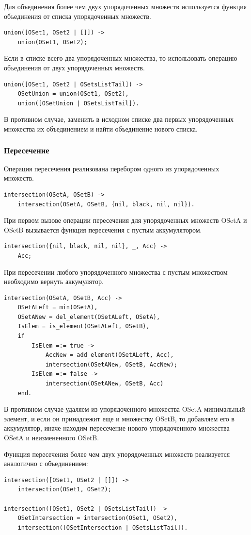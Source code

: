 			Для объединения более чем двух упорядоченных множеств используется функция объединения от списка
			упорядоченных множеств.
			\begin{lstlisting}
union([OSet1, OSet2 | []]) ->
    union(OSet1, OSet2);
			\end{lstlisting}
			Если в списке всего два упорядоченных множества, то использовать операцию объединения от двух 
			упорядоченных множеств.
			\begin{lstlisting}
union([OSet1, OSet2 | OSetsListTail]) ->
    OSetUnion = union(OSet1, OSet2),
    union([OSetUnion | OSetsListTail]).
			\end{lstlisting}
			В противном случае, заменить в исходном списке два первых упорядоченных множества
			их объединением и найти объединение нового списка.
				
		\subsubsection{Пересечение}
			Операция пересечения реализована перебором одного из упорядоченных множеств.
			\begin{lstlisting}
intersection(OSetA, OSetB) ->
    intersection(OSetA, OSetB, {nil, black, nil, nil}).
			\end{lstlisting}
			При первом вызове операции пересечения для упорядоченных множеств OSetA и OSetB
			вызывается функция пересечения с пустым аккумулятором.
			\begin{lstlisting}	
intersection({nil, black, nil, nil}, _, Acc) ->
    Acc;
			\end{lstlisting}
			При пересечении любого упорядоченного множества с пустым множеством необходимо вернуть аккумулятор.
			\begin{lstlisting}	
intersection(OSetA, OSetB, Acc) ->
    OSetALeft = min(OSetA),
    OSetANew = del_element(OSetALeft, OSetA),
    IsElem = is_element(OSetALeft, OSetB),
    if 
        IsElem =:= true -> 
            AccNew = add_element(OSetALeft, Acc),
            intersection(OSetANew, OSetB, AccNew);
        IsElem =:= false -> 
            intersection(OSetANew, OSetB, Acc)
    end.
			\end{lstlisting}
			В противном случае удаляем из упорядоченного множества OSetA минимальный элемент, и если он 
			принадлежит еще и множеству OSetB, то добавляем его в аккумулятор, иначе находим пересечение 
			нового упорядоченного множества OSetA и неизмененного OSetB.
			
			Функция пересечения более чем двух упорядоченных множеств реализуется аналогично с объединением:
			\begin{lstlisting}
intersection([OSet1, OSet2 | []]) ->
    intersection(OSet1, OSet2);

intersection([OSet1, OSet2 | OSetsListTail]) ->
    OSetIntersection = intersection(OSet1, OSet2),
    intersection([OSetIntersection | OSetsListTail]).
			\end{lstlisting}
			
